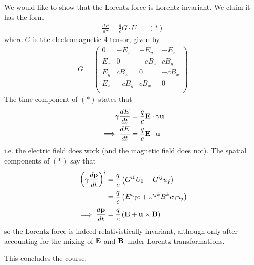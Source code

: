 \documentclass{../template/note}
\begin{document}
    \begin{example*}
        We would like to show that the Lorentz force is Lorentz invariant. We claim it has the form
        \begin{align*}
            \frac{dP}{d\tau} = \frac{q}{c} G \cdot U && (*)
        \end{align*}
        where \(G\) is the electromagnetic 4-tensor, given by
        \begin{align*}
            G = \begin{pmatrix}
                0 & -E_x & -E_y & -E_z \\
                E_x & 0 & -cB_z & cB_y \\
                E_y & cB_z & 0 & -cB_x \\
                E_z & -cB_y & cB_x & 0 \\
            \end{pmatrix}
        \end{align*}
        The time component of \((*)\) states that
        \begin{align*}
            \gamma \frac{dE}{dt} &= \frac{q}{c} \V E \cdot \gamma \V u \\
            \implies \frac{dE}{dt} &= \frac{q}{c} \V E \cdot \V u
        \end{align*}
        i.e. the electric field does work (and the magnetic field does not). The spatial components of \((*)\) say that
        \begin{align*}
            \left(\gamma \frac{d\V p}{dt}\right)^i &= \frac{q}{c}\left(G^{i0}U_0-G^{ij}u_j\right) \\
            &= \frac q c \left(E^i \gamma c + \eps^{ijk}B^kc\gamma u_j\right) \\
            \implies \frac{d\V p}{dt} &= \frac q c \left(\V E + \V u \times \V B\right)
        \end{align*}
        so the Lorentz force is indeed relativistically invariant, although only after accounting for the mixing of \(\V E\) and \(\V B\) under Lorentz transformations.    
    \end{example*}
    
    This concludes the course.
    
    
    
    
    
    
    
    
    
    
    

    
    
\end{document}
